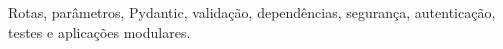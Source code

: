 
Rotas, parâmetros, Pydantic, validação, dependências, segurança, autenticação, testes e aplicações modulares.

